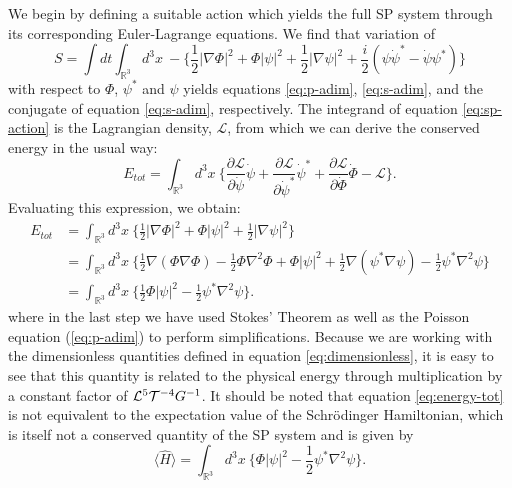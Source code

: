 \documentclass[a4paper,11pt]{article}
\begin{document}
We begin by defining a suitable action which yields the full SP system through its corresponding Euler-Lagrange equations. We find that variation of
\begin{equation}\label{eq:sp-action}
    S=\int dt\int_{\mathbb{R}^3} d^3x \  -\bigg\{\frac{1}{2}\vert\nabla\Phi\vert^2+\Phi\vert\psi\vert^2+\frac{1}{2}\vert\nabla\psi\vert^2+\frac{i}{2}(\psi\Dot{\psi}^*-\Dot{\psi}\psi^*)\bigg\}
\end{equation}
with respect to $\Phi$, $\psi^*$ and $\psi$ yields equations \ref{eq:p-adim}, \ref{eq:s-adim}, and the conjugate of equation \ref{eq:s-adim}, respectively. The integrand of equation \ref{eq:sp-action} is the Lagrangian density, $\mathcal{L}$, from which we can derive the conserved energy in the usual way:
\begin{equation}
    E_{tot}=\int_{\mathbb{R}^3}d^3x \ \bigg\{\frac{\partial \mathcal{L}}{\partial \Dot{\psi}}\Dot{\psi}+\frac{\partial \mathcal{L}}{\partial \Dot{\psi}^*}\Dot{\psi}^*+\frac{\partial \mathcal{L}}{\partial \Dot{\Phi}}\Dot{\Phi}-\mathcal{L}\bigg\}.
\end{equation}
Evaluating this expression, we obtain:
\begin{align}
    E_{tot}&=\int_{\mathbb{R}^3}d^3x \ \bigg\{\frac{1}{2}\vert\nabla\Phi\vert^2+\Phi\vert\psi\vert^2+\frac{1}{2}\vert\nabla\psi\vert^2\bigg\}\\
    &=\int_{\mathbb{R}^3}d^3x \ \bigg\{\frac{1}{2}\nabla(\Phi\nabla\Phi)-\frac{1}{2}\Phi\nabla^2\Phi+\Phi\vert\psi\vert^2+\frac{1}{2}\nabla(\psi^*\nabla\psi)-\frac{1}{2}\psi^*\nabla^2\psi\bigg\}\\
    &=\int_{\mathbb{R}^3}d^3x \ \bigg\{\frac{1}{2}\Phi\vert\psi\vert^2-\frac{1}{2}\psi^*\nabla^2\psi\bigg\}.\label{eq:energy-tot}
\end{align}
where in the last step we have used Stokes' Theorem as well as the Poisson equation (\ref{eq:p-adim}) to perform simplifications. Because we are working with the dimensionless quantities defined in equation \ref{eq:dimensionless}, it is easy to see that this quantity is related to the physical energy through multiplication by a constant factor of $\CMcal{L}^5\CMcal{T}^{-4}G^{-1}$. It should be noted that equation \ref{eq:energy-tot} is not equivalent to the expectation value of the Schr{\"o}dinger Hamiltonian, which is itself not a conserved quantity of the SP system and is given by
\begin{equation}
    \langle\hat{H}\rangle=\int_{\mathbb{R}^3}d^3x \ \bigg\{\Phi\vert\psi\vert^2-\frac{1}{2}\psi^*\nabla^2\psi\bigg\}.
\end{equation}
\end{document}
